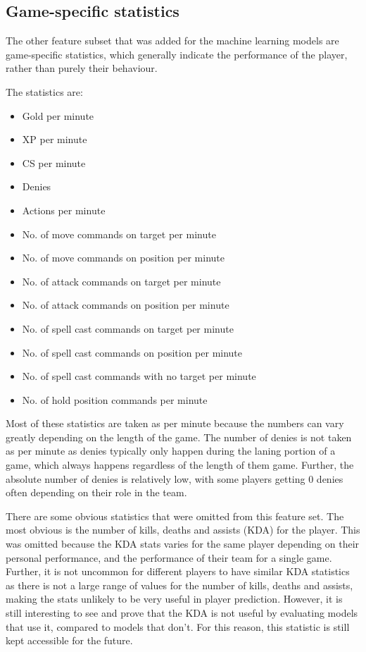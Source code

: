 \documentclass{SizheArticle}
\begin{document}
\subsection{Game-specific statistics}
The other feature subset that was added for the machine learning models are game-specific statistics, which generally indicate the performance of the player, rather than purely their behaviour. 

The statistics are:
\begin{itemize}
\item Gold per minute
\item XP per minute
\item CS per minute
\item Denies
\item Actions per minute
\item No. of move commands on target per minute
\item No. of move commands on position per minute
\item No. of attack commands on target per minute
\item No. of attack commands on position per minute
\item No. of spell cast commands on target per minute
\item No. of spell cast commands on position per minute
\item No. of spell cast commands with no target per minute
\item No. of hold position commands per minute
\end{itemize}
Most of these statistics are taken as per minute because the numbers can vary greatly depending on the length of the game. The number of denies is not taken as per minute as denies typically only happen during the laning portion of a game, which always happens regardless of the length of them game. Further, the absolute number of denies is relatively low, with some players getting 0 denies often depending on their role in the team.

There are some obvious statistics that were omitted from this feature set. The most obvious is the number of kills, deaths and assists (KDA) for the player. This was omitted because the KDA stats varies for the same player depending on their personal performance, and the performance of their team for a single game. Further, it is not uncommon for different players to have similar KDA statistics as there is not a large range of values for the number of kills, deaths and assists, making the stats unlikely to be very useful in player prediction. However, it is still interesting to see and prove that the KDA is not useful by evaluating models that use it, compared to models that don't. For this reason, this statistic is still kept accessible for the future. 
\end{document}
